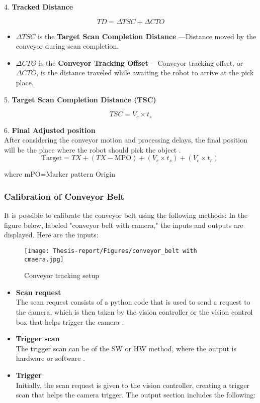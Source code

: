 \documentclass[12pt]{article}
\begin{document}
4. \textbf{Tracked Distance} 

\[
TD = \Delta TSC + \Delta CTO 
\]

\begin{itemize}
  \item $\Delta TSC$ is the \textbf{Target Scan Completion Distance}%
        —Distance moved by the conveyor during scan completion\cite{ref21}.
  \item $\Delta CTO$ is the \textbf{Conveyor Tracking Offset}%
        —Conveyor tracking offset, or $\Delta CTO$, is the distance traveled while awaiting the robot to arrive at the pick place\cite{ref21}.
\end{itemize}

5. \textbf{Target Scan Completion Distance (TSC)} 

\begin{center}
    \[
    TSC = V_c \times t_s 
    \]
\end{center}

6. \textbf{Final Adjusted position}\\

After considering the conveyor motion and processing delays, the final position will be the place where the robot should pick the object \cite{ref21}.\\

\[
\text{Target} = TX + (TX - \text{MPO}) + (V_c \times t_s) + (V_c \times t_r)\
\]

where mPO=Marker pattern Origin
\subsubsection{Calibration of Conveyor Belt}
It is possible to calibrate the conveyor belt using the following methods:   In the figure below, labeled "conveyor belt with camera," the inputs and outputs are displayed.  Here are the inputs:

\begin{figure}[h]
    \centering
    \texttt{[image: Thesis-report/Figures/conveyor\_belt with cmaera.jpg]} 
    \caption{Conveyor tracking setup}
    \label{fig:conveyor_belt with cmaera}
\end{figure}

\begin{itemize}
\item \textbf{Scan request}\\
The scan request consists of a  python code that is used to send a request to the camera, which is then taken by the vision controller or the vision control box that helps trigger the camera \cite{ref21}.
 \item \textbf{Trigger scan}\\
 The trigger scan can be of the SW or HW method, where the output is hardware or software \cite{ref21}.

\item \textbf{Trigger }\\
Initially, the scan request is given to the vision controller, creating a trigger scan that helps the camera trigger\cite{ref21}.
The output section includes the following:
\end{itemize}
\end{document}
